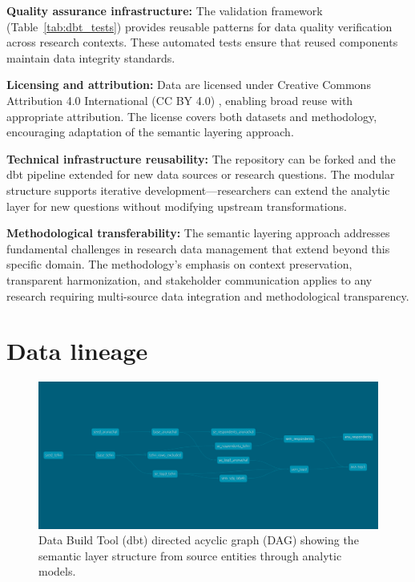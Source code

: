 \documentclass{article}
\begin{document}
\textbf{Quality assurance infrastructure:} The validation framework (Table~\ref{tab:dbt_tests}) provides reusable patterns for data quality verification across research contexts. These automated tests ensure that reused components maintain data integrity standards.

\textbf{Licensing and attribution:} Data are licensed under Creative Commons Attribution 4.0 International (CC BY 4.0) \cite{creative_commons}, enabling broad reuse with appropriate attribution. The license covers both datasets and methodology, encouraging adaptation of the semantic layering approach.

\textbf{Technical infrastructure reusability:} The repository can be forked and the dbt pipeline extended for new data sources or research questions. The modular structure supports iterative development—researchers can extend the analytic layer for new questions without modifying upstream transformations.

\textbf{Methodological transferability:} The semantic layering approach addresses fundamental challenges in research data management that extend beyond this specific domain. The methodology's emphasis on context preservation, transparent harmonization, and stakeholder communication applies to any research requiring multi-source data integration and methodological transparency.

\section{Data lineage}
\label{sec:data-lineage}

\begin{figure}[ht]
\centering
\includegraphics[width=\textwidth]{img/dbt-dag.png}
\caption{Data Build Tool (dbt) directed acyclic graph (DAG) showing the semantic layer structure from source entities through analytic models.}
\label{fig:dbtdag}
\end{figure}
\end{document}
